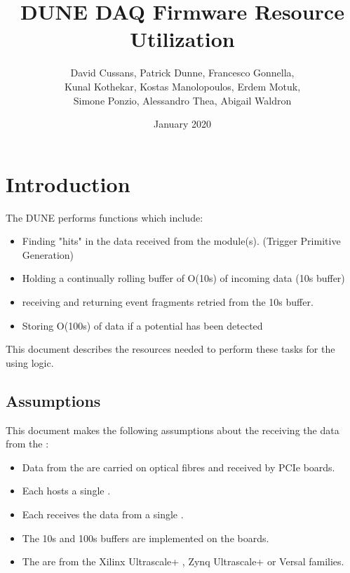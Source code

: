\documentclass{article}
\title{DUNE DAQ Firmware Resource Utilization}
\author{David Cussans, Patrick Dunne, Francesco Gonnella,\\ Kunal Kothekar, Kostas Manolopoulos, Erdem Motuk,\\ Simone Ponzio, Alessandro Thea, Abigail Waldron}
\date{January 2020}
\begin{document}

\maketitle

\section{Introduction}

The DUNE  performs functions which include:

\begin{itemize}
  \item Finding "hits" in the data received from the \single module(s). (Trigger Primitive Generation)
  \item Holding a continually rolling buffer of O(10s) of incoming data (10s buffer)
  \item receiving  and returning event fragments retried from the 10s buffer.
  \item Storing O(100s) of data if a potential  has been detected
\end{itemize}

This document describes the resources needed to perform these tasks for the \single {} using  logic.

\subsection{Assumptions}

This document makes the following assumptions about the  receiving the data from the \single {}:

\begin{itemize}
  \item Data from the  are carried on optical fibres and received by  PCIe boards.
  \item Each  hosts a single .
  \item Each  receives the data from a single .
  \item The 10s and 100s buffers are implemented on the  boards.
  \item The  are from the Xilinx Ultrascale+ , Zynq Ultrascale+ or Versal  families.
\end{itemize}
\end{document}
